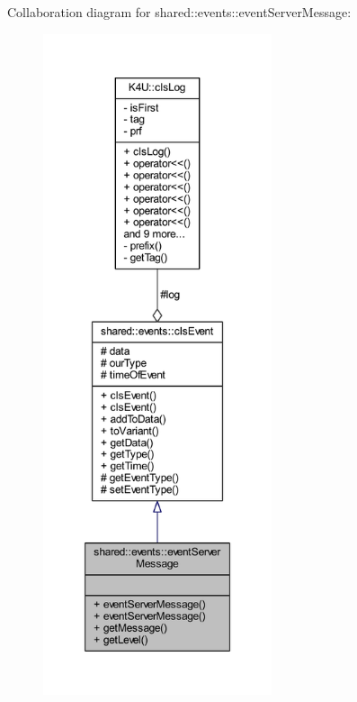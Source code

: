 Collaboration diagram for shared\-:\-:events\-:\-:event\-Server\-Message\-:\nopagebreak
\begin{figure}[H]
\begin{center}
\leavevmode
\includegraphics[height=550pt]{dc/d04/classshared_1_1events_1_1event_server_message__coll__graph}
\end{center}
\end{figure}
